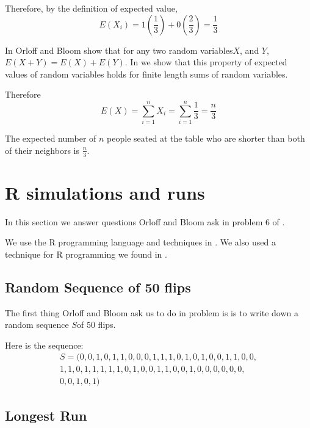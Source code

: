 \documentclass[a4paper,11pt]{article}
\begin{document}
Therefore, by the definition of expected value,
\begin{equation}
  E\left( X_{i} \right) = 1 \left( \frac{1}{3} \right)
    + 0 \left( \frac{2}{3} \right) = \frac{1}{3}
\end{equation}

In \cite{reading4b} Orloff and Bloom show that for any two random
variables$X$, and $Y$, $E \left( X + Y \right) = E \left( X \right) +
E \left(Y \right)$.  In \cite{hannySlides4} we show that this property
of expected values of random variables holds for finite length sums
of random variables.

Therefore
\begin{equation}
 E(X) = \sum_{i=1}^{n} X_{i} = \sum_{i=1}^{n} \frac{1}{3} = \frac{n}{3}
\end{equation}

The expected number of $n$ people seated at the table who are shorter
than both of their neighbors is $\frac{n}{3}$.


\section{R simulations and runs}
In this section we answer questions Orloff and Bloom ask in problem 6
of \cite{probSet2}.

We use the R programming language and techniques in \cite{reading4R}.
We also used a technique for R programming we found in \cite{rleHint}.

\subsection{Random Sequence of 50 flips}
The first thing Orloff and Bloom ask us to do in problem is is to
write down a random sequence $S$of 50 flips.

Here is the sequence:
\begin{equation}
\begin{split}
S= (0, 0, 1, 0, 1, 1, 0, 0, 0, 1, 1, 1, 0, 1, 0, 1, 0, 0, 1, 1, 0, 0, \\
1, 1, 0, 1, 1, 1, 1, 1, 0, 1, 0, 0, 1, 1, 0, 0, 1, 0, 0, 0, 0, 0, 0, \\
0, 0, 1, 0, 1)
\end{split}
\end{equation}

\subsection{Longest Run}
\end{document}
